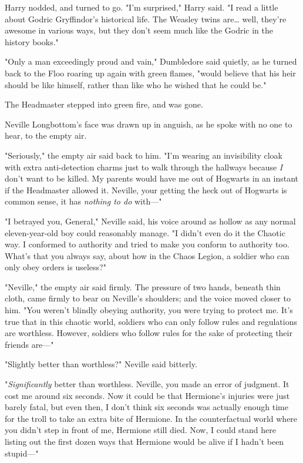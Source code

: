 Harry nodded, and turned to go. "I'm surprised," Harry said. "I read a little
about Godric Gryffindor's historical life. The Weasley twins are{\ldots} well,
they're awesome in various ways, but they don't seem much like the Godric in
the history books."

"Only a man exceedingly proud and vain," Dumbledore said quietly, as he turned
back to the Floo roaring up again with green flames, "would believe that his
heir should be like himself, rather than like who he wished that he could be."

The Headmaster stepped into green fire, and was gone.

Neville Longbottom's face was drawn up in anguish, as he spoke with no one to
hear, to the empty air.

"Seriously," the empty air said back to him. "I'm wearing an invisibility cloak
with extra anti-detection charms just to walk through the hallways because
\emph{I} don't want to be killed. My parents would have me out of Hogwarts in
an instant if the Headmaster allowed it. Neville, your getting the heck out of
Hogwarts is common sense, it has \emph{nothing to do} with---"

"I betrayed you, General," Neville said, his voice around as hollow as any
normal eleven-year-old boy could reasonably manage. "I didn't even do it the
Chaotic way. I conformed to authority and tried to make you conform to
authority too. What's that you always say, about how in the Chaos Legion, a
soldier who can only obey orders is useless?"

"Neville," the empty air said firmly. The pressure of two hands, beneath thin
cloth, came firmly to bear on Neville's shoulders; and the voice moved closer
to him. "You weren't blindly obeying authority, you were trying to protect me.
It's true that in this chaotic world, soldiers who can only follow rules and
regulations are worthless. However, soldiers who follow rules for the sake of
protecting their friends are---"

"Slightly better than worthless?" Neville said bitterly.

"\emph{Significantly} better than worthless. Neville, you made an error of
judgment. It cost me around six seconds. Now it could be that Hermione's
injuries were just barely fatal, but even then, I don't think six seconds was
actually enough time for the troll to take an extra bite of Hermione. In the
counterfactual world where you didn't step in front of me, Hermione still died.
Now, I could stand here listing out the first dozen ways that Hermione would be
alive if I hadn't been stupid---"

